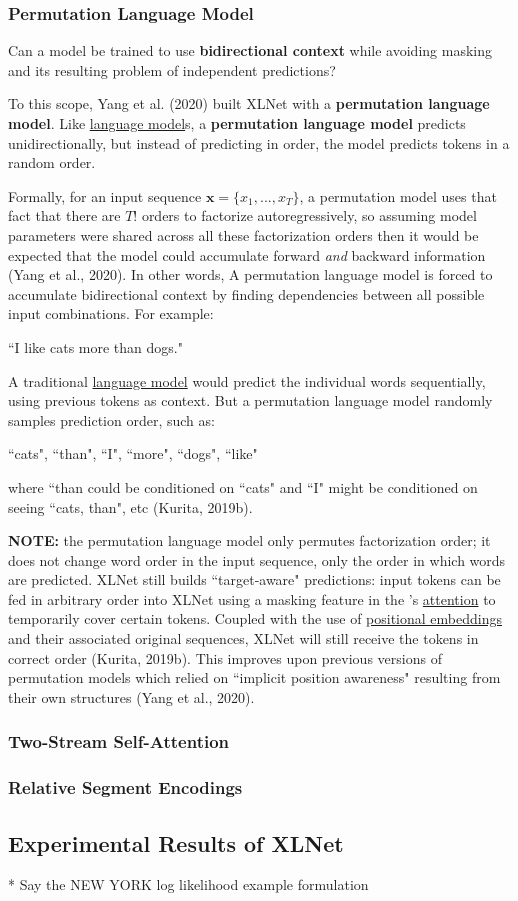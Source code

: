\subsubsection{Permutation Language Model} \label{sec:permutationLM}

Can a model be trained to use \textbf{bidirectional context} while avoiding masking and its resulting problem of independent predictions?

To this scope, Yang et al. (2020) built XLNet with a \textbf{permutation language model}. Like  \hyperref[sec:LanguageModels]{language model}s, a \textbf{permutation language model} predicts unidirectionally, but instead of predicting in order, the model predicts tokens in a random order. 

Formally, for an input sequence $\textbf{x} = \Big\{ x_1,..., x_T \Big\}$, a permutation model uses that fact that there are $T!$ orders to factorize autoregressively, so assuming model parameters were shared across all these factorization orders then it would be expected that the model could accumulate forward \emph{and} backward information (Yang et al., 2020). In other words, A permutation language model is forced to accumulate bidirectional context by finding dependencies between all possible input combinations. For example: 

``I like cats more than dogs." 

A traditional \hyperref[sec:LanguageModels]{language model} would predict the individual words sequentially, using previous tokens as context. But a permutation language model randomly samples prediction order, such as:

``cats", ``than", ``I", ``more", ``dogs", ``like"

where ``than could be conditioned on ``cats" and ``I" might be conditioned on seeing ``cats, than", etc (Kurita, 2019b). 



\textbf{NOTE: } the permutation language model only permutes factorization order; it does not change word order in the input sequence, only the order in which words are predicted. 
XLNet still builds ``target-aware" predictions: input tokens can be fed in arbitrary order into XLNet using a masking feature in the 's \hyperref[sec:AttentionMechanism]{attention} to temporarily cover certain tokens. Coupled with the use of \hyperref[sec:PosEncodings]{positional embeddings} and their associated original sequences, XLNet will still receive the tokens in correct order (Kurita, 2019b). This improves upon previous versions of permutation models which relied on ``implicit position awareness" resulting from their own structures (Yang et al., 2020). 




\subsubsection{Two-Stream Self-Attention }


\subsubsection{Relative Segment Encodings}


\subsection{Experimental Results of XLNet}

* Say the NEW YORK log likelihood example formulation